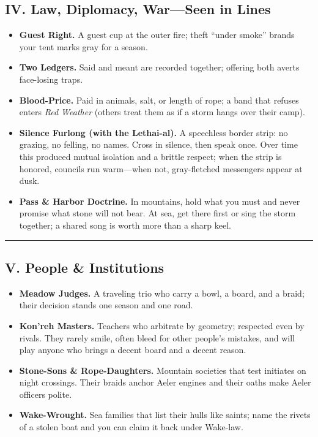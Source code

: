 \documentclass[11pt,letterpaper]{article}
\begin{document}
\subsection{IV. Law, Diplomacy, War---Seen in Lines}

\begin{itemize}[leftmargin=*]
  \item \textbf{Guest Right.} A guest cup at the outer fire; theft ``under smoke'' brands your tent marks gray for a season.
  \item \textbf{Two Ledgers.} Said and meant are recorded together; offering both averts face-losing traps.
  \item \textbf{Blood-Price.} Paid in animals, salt, or length of rope; a band that refuses enters \emph{Red Weather} (others treat them as if a storm hangs over their camp).
  \item \textbf{Silence Furlong (with the Lethai-al).} A speechless border strip: no grazing, no felling, no names. Cross in silence, then speak once. Over time this produced mutual isolation and a brittle respect; when the strip is honored, councils run warm---when not, gray-fletched messengers appear at dusk.
  \item \textbf{Pass \& Harbor Doctrine.} In mountains, hold what you must and never promise what stone will not bear. At sea, get there first or sing the storm together; a shared song is worth more than a sharp keel.
\end{itemize}

\medskip\hrule\medskip

\subsection{V. People \& Institutions}

\begin{itemize}[leftmargin=*]
  \item \textbf{Meadow Judges.} A traveling trio who carry a bowl, a board, and a braid; their decision stands one season and one road.
  \item \textbf{Kon'reh Masters.} Teachers who arbitrate by geometry; respected even by rivals. They rarely smile, often bleed for other people's mistakes, and will play anyone who brings a decent board and a decent reason.
  \item \textbf{Stone-Sons \& Rope-Daughters.} Mountain societies that test initiates on night crossings. Their braids anchor Aeler engines and their oaths make Aeler officers polite.
  \item \textbf{Wake-Wrought.} Sea families that list their hulls like saints; name the rivets of a stolen boat and you can claim it back under Wake-law.
\end{itemize}
\end{document}

